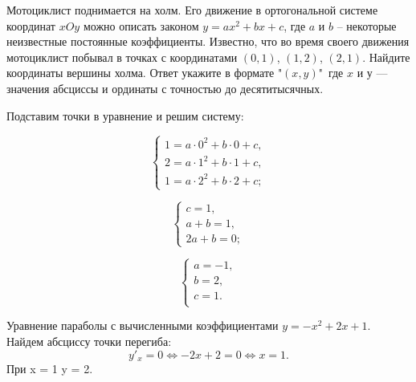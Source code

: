 
Мотоциклист поднимается на холм. Его движение в ортогональной системе координат $xOy$ 
можно описать законом $y = ax^2+bx+c$, где $a$ и $b$ -- некоторые неизвестные постоянные коэффициенты. 
Известно, что во время своего движения мотоциклист побывал в точках с координатами $(0,1)$, $(1,2)$, $(2,1)$. 
Найдите координаты вершины холма. Ответ укажите в формате "$(x, y)$"\, где $x$ и $у$ — значения абсциссы и ординаты с точностью до десятитысячных.

\soultionSection

Подставим точки в уравнение и решим систему:

\begin{equation*} 
    \begin{cases}
    1 = a\cdot 0^2 + b\cdot 0 + c,\\
    2 = a\cdot 1^2 + b\cdot 1 + c,\\
    1 = a\cdot 2^2 + b\cdot 2 + c;
    \end{cases}
\end{equation*}

\begin{equation*} 
    \begin{cases}
    c = 1,\\
    a + b = 1,\\
    2a + b = 0;
    \end{cases}
\end{equation*}

\begin{equation*} 
    \begin{cases}
        a = -1,\\
        b = 2, \\
        c = 1. \\
    \end{cases}
\end{equation*}

Уравнение параболы с вычисленными коэффициентами $y = -x^2 + 2x + 1$. Найдем абсциссу точки перегиба: 
$$y'_x=0 \Leftrightarrow -2x + 2 = 0 \Leftrightarrow x = 1. $$
При x = 1 y = 2.

